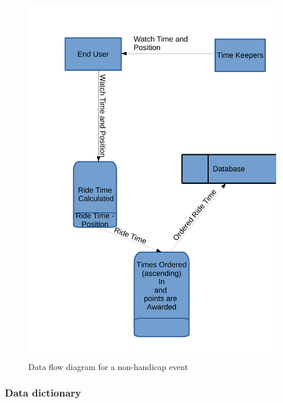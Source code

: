\begin{figure}
	\includegraphics[width=\textwidth]{./Non-HandicapDFD-PS.pdf}
	\caption{Data flow diagram for a non-handicap event}
\end{figure}

\subsubsection{Data dictionary}


